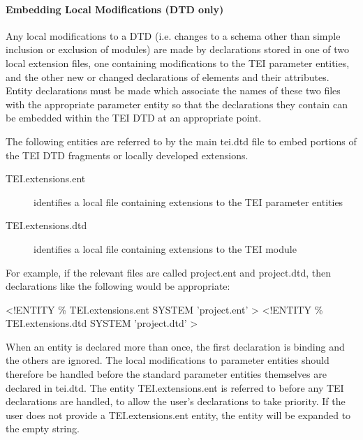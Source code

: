 \paragraph[{Embedding Local Modifications (DTD only)}]{Embedding Local Modifications (DTD only)}\label{STOVLO}\par
Any local modifications to a DTD (i.e. changes to a schema other than simple inclusion or exclusion of modules) are made by declarations stored in one of two local extension files, one containing modifications to the TEI parameter entities, and the other new or changed declarations of elements and their attributes. Entity declarations must be made which associate the names of these two files with the appropriate parameter entity so that the declarations they contain can be embedded within the TEI DTD at an appropriate point.\par
The following entities are referred to by the main \textsf{tei.dtd} file to embed portions of the TEI DTD fragments or locally developed extensions. \begin{description}

\item[{\textsf{TEI.extensions.ent}}]identifies a local file containing extensions to the TEI parameter entities
\item[{\textsf{TEI.extensions.dtd}}]identifies a local file containing extensions to the TEI module
\end{description} \par
For example, if the relevant files are called \textsf{project.ent} and \textsf{project.dtd}, then declarations like the following would be appropriate: \par\hfill\bgroup\exampleFont\vskip 10pt\begin{shaded}
\obeyspaces <!ENTITY \% TEI.extensions.ent SYSTEM 'project.ent' >\newline
<!ENTITY \% TEI.extensions.dtd SYSTEM 'project.dtd' >\end{shaded}
\par\egroup 
\par
When an entity is declared more than once, the first declaration is binding and the others are ignored. The local modifications to parameter entities should therefore be handled before the standard parameter entities themselves are declared in \textsf{tei.dtd}. The entity \textsf{TEI.extensions.ent} is referred to before any TEI declarations are handled, to allow the user's declarations to take priority. If the user does not provide a \textsf{TEI.extensions.ent} entity, the entity will be expanded to the empty string.\par
